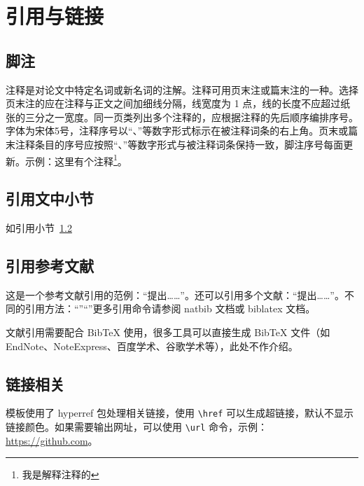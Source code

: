 
\chapter{引用与链接}

\section{脚注}
注释是对论文中特定名词或新名词的注解。注释可用页末注或篇末注的一种。选择页末注的应在注释与正文之间加细线分隔，线宽度为 1 点，线的长度不应超过纸张的三分之一宽度。同一页类列出多个注释的，应根据注释的先后顺序编排序号。字体为宋体5号，注释序号以“、”等数字形式标示在被注释词条的右上角。页末或篇末注释条目的序号应按照“、”等数字形式与被注释词条保持一致，脚注序号每面更新。示例：这里有个注释\footnote{我是解释注释的}。

\section{引用文中小节}\label{sec:ref}
如引用小节~\ref{sec:ref}

\section{引用参考文献}
这是一个参考文献引用的范例：“\cite{江泽民1989能源发展趋势及主要节能措施}提出……”。还可以引用多个文献：“\cite{kuhn2004man,江泽民2008新时期我国信息技术产业的发展,江泽民1989能源发展趋势及主要节能措施}提出……”。不同的引用方法：“\citet{江泽民1989能源发展趋势及主要节能措施}”“\citep{江泽民2008新时期我国信息技术产业的发展}”更多引用命令请参阅 natbib 文档或 biblatex 文档。\nocite{*}

文献引用需要配合 BibTeX 使用，很多工具可以直接生成 BibTeX 文件（如 EndNote、NoteExpress、百度学术、谷歌学术等），此处不作介绍。

\section{链接相关}
模板使用了 hyperref 包处理相关链接，使用 \verb|\href| 可以生成超链接，默认不显示链接颜色。如果需要输出网址，可以使用 \verb|\url| 命令，示例：\url{https://github.com}。